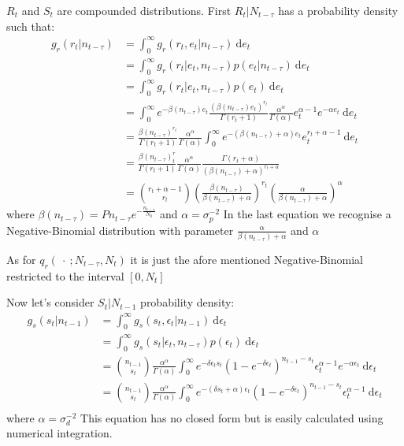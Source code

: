 \documentclass{article}
\begin{document}
	$R_t$ and $S_t$ are compounded distributions.
	First $R_t | N_{t-\tau}$ has a probability density such that:
	\begin{equation*}
	\begin{split}
			g_r(r_t | n_{t-\tau}) & = \int_{0}^{\infty}g_r(r_t, e_t | n_{t-\tau})\ \mathrm{d}e_t \\
			& = \int_{0}^{\infty}g_r(r_t | e_t, n_{t-\tau})p(e_t | n_{t-\tau})\ \mathrm{d}e_t \\
			& = \int_{0}^{\infty}g_r(r_t | e_t, n_{t-\tau})p(e_t)\ \mathrm{d}e_t \\
			& = \int_{0}^{\infty}e^{-\beta(n_{t-\tau})e_t}\frac{(\beta(n_{t-\tau})e_t)^{r_t}}{\Gamma(r_t+1)}\frac{\alpha^\alpha}{\Gamma(\alpha)}e_t^{\alpha-1}e^{-\alpha e_t}\ \mathrm{d}e_t \\
			& = \frac{\beta(n_{t-\tau})^{r_t}}{\Gamma(r_t+1)}\frac{\alpha^\alpha}{\Gamma(\alpha)}\int_{0}^{\infty}e^{-(\beta(n_{t-\tau})+\alpha)e_t}e_t^{r_t+\alpha-1}\ \mathrm{d}e_t \\
			& = \frac{\beta(n_{t-\tau})^r_t}{\Gamma(r_t+1)}\frac{\alpha^\alpha}{\Gamma(\alpha)}\frac{\Gamma(r_t+\alpha)}{(\beta(n_{t-\tau})+\alpha)^{r_t+\alpha}} \\
			& = \binom{r_t + \alpha - 1}{r_t}(\frac{\beta(n_{t-\tau})}{\beta(n_{t-\tau}) + \alpha})^{r_t}(\frac{\alpha}{\beta(n_{t-\tau}) + \alpha})^\alpha
	\end{split}
	\end{equation*}
	where $\beta(n_{t-\tau}) = Pn_{t-\tau}e^{-\frac{n_{t-\tau}}{N_0}}$ and $\alpha = \sigma_p^{-2}$
	In the last equation we recognise a Negative-Binomial distribution with parameter $\frac{\alpha}{\beta(n_{t-\tau}) + \alpha}$ and $\alpha$
	
	As for $q_r(\ \cdot \ ; N_{t-\tau}, N_t)$ it is just the afore mentioned Negative-Binomial restricted to the interval $[0, N_t]$
	
	Now let's consider $S_t | N_{t-1}$ probability density:
	\begin{equation*}
	\begin{split}
	g_s(s_t | n_{t-1}) & = \int_{0}^{\infty}g_s(s_t, \epsilon_t | n_{t-1})\ \mathrm{d}\epsilon_t \\
	& = \int_{0}^{\infty}g_s(s_t | \epsilon_t, n_{t-\tau})p(\epsilon_t)\ \mathrm{d}\epsilon_t \\
	& = \binom{n_{t-1}}{s_t}\frac{\alpha^\alpha}{\Gamma(\alpha)} \int_{0}^{\infty}e^{-\delta\epsilon_t s_t}(1-e^{-\delta\epsilon_t})^{n_{t-1}-s_t}\epsilon_t^{\alpha-1}e^{-\alpha\epsilon_t}\ \mathrm{d}\epsilon_t \\
	& = \binom{n_{t-1}}{s_t}\frac{\alpha^\alpha}{\Gamma(\alpha)}\int_{0}^{\infty}e^{-(\delta s_t+\alpha)\epsilon_t }(1-e^{-\delta\epsilon_t})^{n_{t-1}-s_t}\epsilon_t^{\alpha-1}\ \mathrm{d}\epsilon_t \\
	\end{split}
	\end{equation*}
	where $\alpha = \sigma_d^{-2}$
	This equation has no closed form but is easily calculated using numerical integration.
	
\end{document}
